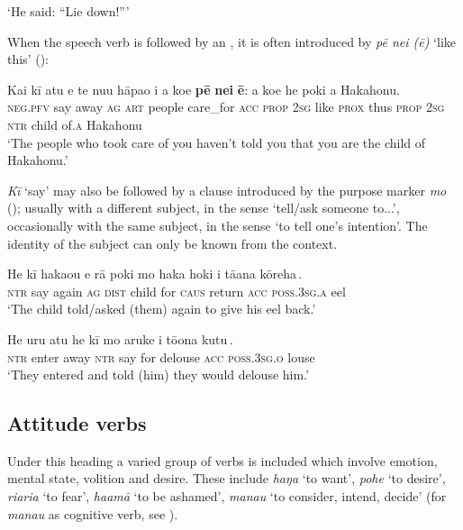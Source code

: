 \glt
‘He said: “Lie down!”’ \textstyleExampleref{[Ley-5-28a.003]}
\z

When the speech verb is followed by an , it is often introduced by \textit{pē nei (ē)} ‘like this’ ():

\ea\label{ex:11.67}
\gll Kai kī atu e te nu{\ꞌ}u hāpa{\ꞌ}o i a koe \textbf{pē} \textbf{nei} \textbf{ē}: a koe he poki {\ꞌ}a Hakahonu.\\
\textsc{neg.pfv} say away \textsc{ag} \textsc{art} people care\_for \textsc{acc} \textsc{prop} \textsc{2sg} like \textsc{prox} thus \textsc{prop} \textsc{2sg} \textsc{ntr} child of\textsc{.a} Hakahonu\\

\glt 
‘The people who took care of you haven’t told you that you are the child of Hakahonu.’ \textstyleExampleref{[R427.016]} 
\z

\textit{Kī} ‘say’ may also be followed by a  clause introduced by the purpose marker \textit{mo} (); usually with a different subject, in the sense ‘tell/ask someone to...’, occasionally with the same subject, in the sense ‘to tell one’s intention’. The identity of the subject can only be known from the context.

\ea\label{ex:11.68}
\gll He kī haka{\ꞌ}ou e rā poki {\ob}mo haka hoki i tā{\ꞌ}ana kōreha\,{\cb}. \\
\textsc{ntr} say again \textsc{ag} \textsc{dist} child {\db}for \textsc{caus} return \textsc{acc} \textsc{poss.3sg.a} eel \\
\glt 
‘The child told/asked (them) again to give his eel back.’ \textstyleExampleref{[R532-10.014]}
\z

\ea\label{ex:11.69}
\gll He uru atu he kī {\ob}mo {\ꞌ}aruke i tō{\ꞌ}ona kutu\,{\cb}. \\
\textsc{ntr} enter away \textsc{ntr} say {\db}for delouse \textsc{acc} \textsc{poss.3sg.o} louse \\

\glt 
‘They entered and told (him) they would delouse him.’ \textstyleExampleref{[R310.030]} 
\z
{}
\subsection{Attitude verbs}\label{sec:11.3.5}

Under this heading a varied group of verbs is included which involve emotion, mental state, volition and desire. These include \textit{haŋa} ‘to want’, \textit{pohe} ‘to desire’, \textit{\mbox{ri{\ꞌ}ari{\ꞌ}a}} ‘to fear’, \textit{ha{\ꞌ}amā} ‘to be ashamed’, \textit{mana{\ꞌ}u} ‘to consider, intend, decide’ (for \textit{mana{\ꞌ}u} as cognitive verb, see ).

